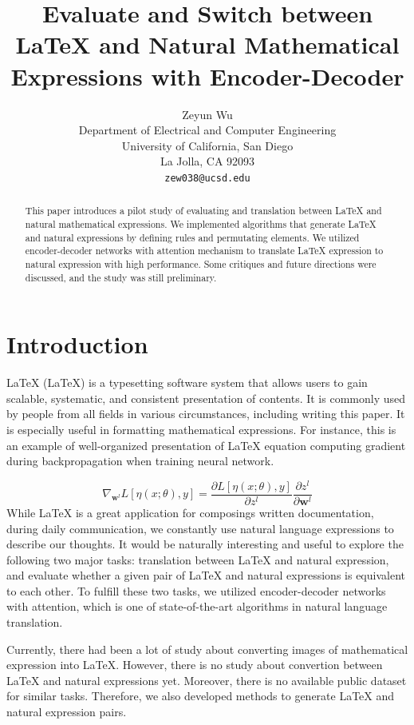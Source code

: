 \documentclass{article}
\title{Evaluate and Switch between LaTeX and Natural Mathematical Expressions with Encoder-Decoder}
\author{
    Zeyun Wu\\
    Department of Electrical and Computer Engineering \\
    University of California, San Diego \\
    La Jolla, CA 92093 \\
    \texttt{zew038@ucsd.edu}
}
\begin{document}
    
\maketitle

\begin{abstract}
This paper introduces a pilot study of evaluating and translation between LaTeX and natural mathematical expressions. We implemented algorithms that generate LaTeX and natural expressions by defining rules and permutating elements. We utilized encoder-decoder networks with attention mechanism to translate LaTeX expression to natural expression with high performance. Some critiques and future directions were discussed, and the study was still preliminary. 
\end{abstract}

\section{Introduction}
LaTeX (\LaTeX) is a typesetting software system that allows users to gain scalable, systematic, and consistent presentation of contents. It is commonly used by people from all fields in various circumstances, including writing this paper. It is especially useful in formatting mathematical expressions. For instance, this is an example of well-organized presentation of LaTeX equation computing gradient during backpropagation when training neural network. \par 
\[ \nabla_{\mathbf{w}^l} L[\eta(x; \theta), y] = \frac{\partial L[\eta(x; \theta), y]}{\partial z^l} \frac{\partial z^l}{\partial \mathbf{w}^l} \]
While LaTeX is a great application for composings written documentation, during daily communication, we constantly use natural language expressions to describe our thoughts. It would be naturally interesting and useful to explore the following two major tasks: translation between LaTeX and natural expression, and evaluate whether a given pair of LaTeX and natural expressions is equivalent to each other. To fulfill these two tasks, we utilized encoder-decoder networks with attention, which is one of state-of-the-art algorithms in natural language translation. \par 
Currently, there had been a lot of study about converting images of mathematical expression into LaTeX. However, there is no study about convertion between LaTeX and natural expressions yet. Moreover, there is no available public dataset for similar tasks. Therefore, we also developed methods to generate LaTeX and natural expression pairs. 
% 
%
\end{document}
